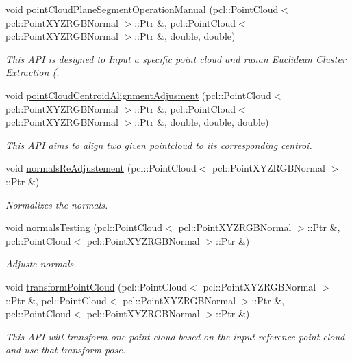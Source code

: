 \begin{DoxyCompactItemize}
void \hyperlink{classReconstruction_a621af3745966b359e10c02a570658c5c}{point\+Cloud\+Plane\+Segment\+Operation\+Manual} (pcl\+::\+Point\+Cloud$<$ pcl\+::\+Point\+X\+Y\+Z\+R\+G\+B\+Normal $>$\+::Ptr \&, pcl\+::\+Point\+Cloud$<$ pcl\+::\+Point\+X\+Y\+Z\+R\+G\+B\+Normal $>$\+::Ptr \&, double, double)
\begin{DoxyCompactList}\small\item\em This A\+PI is designed to Input a specific point cloud and runan Euclidean Cluster Extraction (. \end{DoxyCompactList}\item 
void \hyperlink{classReconstruction_a0c9482066c467e769715d5ffde762225}{point\+Cloud\+Centroid\+Alignment\+Adjusment} (pcl\+::\+Point\+Cloud$<$ pcl\+::\+Point\+X\+Y\+Z\+R\+G\+B\+Normal $>$\+::Ptr \&, pcl\+::\+Point\+Cloud$<$ pcl\+::\+Point\+X\+Y\+Z\+R\+G\+B\+Normal $>$\+::Ptr \&, double, double, double)
\begin{DoxyCompactList}\small\item\em This A\+PI aims to align two given pointcloud to its corresponding centroi. \end{DoxyCompactList}\item 
void \hyperlink{classReconstruction_adbc413f7611f3984cbfcff77b9c23df6}{normals\+Re\+Adjustement} (pcl\+::\+Point\+Cloud$<$ pcl\+::\+Point\+X\+Y\+Z\+R\+G\+B\+Normal $>$\+::Ptr \&)
\begin{DoxyCompactList}\small\item\em Normalizes the normals. \end{DoxyCompactList}\item 
void \hyperlink{classReconstruction_ab8b679093ca295de818b4bdf84ec79af}{normals\+Testing} (pcl\+::\+Point\+Cloud$<$ pcl\+::\+Point\+X\+Y\+Z\+R\+G\+B\+Normal $>$\+::Ptr \&, pcl\+::\+Point\+Cloud$<$ pcl\+::\+Point\+X\+Y\+Z\+R\+G\+B\+Normal $>$\+::Ptr \&)
\begin{DoxyCompactList}\small\item\em Adjuste normals. \end{DoxyCompactList}\item 
void \hyperlink{classReconstruction_a74cf80cebcf9600860881f57a8986823}{transform\+Point\+Cloud} (pcl\+::\+Point\+Cloud$<$ pcl\+::\+Point\+X\+Y\+Z\+R\+G\+B\+Normal $>$\+::Ptr \&, pcl\+::\+Point\+Cloud$<$ pcl\+::\+Point\+X\+Y\+Z\+R\+G\+B\+Normal $>$\+::Ptr \&, pcl\+::\+Point\+Cloud$<$ pcl\+::\+Point\+X\+Y\+Z\+R\+G\+B\+Normal $>$\+::Ptr \&)
\begin{DoxyCompactList}\small\item\em This A\+PI will transform one point cloud based on the input reference point cloud and use that transform pose. \end{DoxyCompactList}\item 

\end{DoxyCompactItemize}
